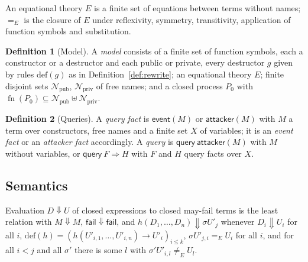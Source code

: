 \documentclass[11pt]{article}
\theoremstyle{definition}
\newtheorem{definition}{Definition}[section]
\theoremstyle{plain}
\theoremstyle{remark}
\newcommand{\fn}{\operatorname{fn}}
\begin{document}
An equational theory $E$ is a finite set of equations between terms without names; $=_E$ is the closure of $E$ under reflexivity, symmetry, transitivity, application of function symbols and substitution.

\begin{definition}[Model]\label{def:model}
A \textit{model} consists of a finite set of function symbols, each a constructor or a destructor and each public or private, every destructor $g$ given by rules $\mathrm{def}(g)$ as in Definition~\ref{def:rewrite}; an equational theory $E$; finite disjoint sets $\mathcal{N}_{\mathrm{pub}}$, $\mathcal{N}_{\mathrm{priv}}$ of free names; and a closed process $P_0$ with $\fn(P_0)\subseteq\mathcal{N}_{\mathrm{pub}}\uplus\mathcal{N}_{\mathrm{priv}}$.
\end{definition}

\begin{definition}[Queries]\label{def:queries}
A \textit{query fact} is $\mathsf{event}(M)$ or $\mathsf{attacker}(M)$ with $M$ a term over constructors, free names and a finite set $X$ of variables; it is an \textit{event fact} or an \textit{attacker fact} accordingly. A \textit{query} is $\mathsf{query}\ \mathsf{attacker}(M)$ with $M$ without variables, or $\mathsf{query}\ F\Longrightarrow H$ with $F$ and $H$ query facts over $X$.
\end{definition}

\subsection{Semantics}

Evaluation $D\Downarrow U$ of closed expressions to closed may-fail terms is the least relation with $M\Downarrow M$, $\mathsf{fail}\Downarrow\mathsf{fail}$, and $h(D_1,\dots,D_n)\Downarrow\sigma U'_j$ whenever $D_i\Downarrow U_i$ for all $i$, $\mathrm{def}(h)=(h(U'_{i,1},\dots,U'_{i,n})\to U'_i)_{i\le k}$, $\sigma U'_{j,i}=_E U_i$ for all $i$, and for all $i<j$ and all $\sigma'$ there is some $l$ with $\sigma'U'_{i,l}\ne_E U_l$.
\end{document}
